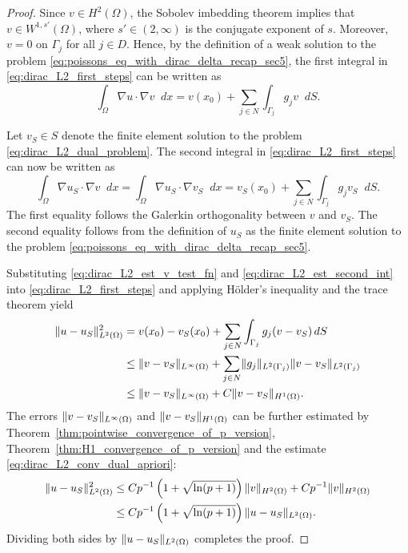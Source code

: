 \documentclass[english, 12pt, a4paper, sci, utf8, a-2b, online]{aaltothesis}
\theoremstyle{definition}
\theoremstyle{plain}
\DeclarePairedDelimiter\norm{\lVert}{\rVert}
\newcommand*\diff{\mathop{}\!d}
\numberwithin{equation}{section}
\begin{document}
\begin{proof}
    Since $v \in H^2(\Omega)$, the Sobolev imbedding theorem implies that
    $v \in W^{1,s'}(\Omega)$, where $s' \in (2, \infty)$ is the conjugate exponent of $s$.
    Moreover, $v = 0$ on $\Gamma_j$ for all $j \in D$.
    Hence, by the definition of a weak solution to the problem
    \eqref{eq:poissons_eq_with_dirac_delta_recap_sec5}, the first integral in
    \eqref{eq:dirac_L2_first_steps} can be written as
    \begin{equation}
        \label{eq:dirac_L2_est_v_test_fn}
        \int_{\Omega} \nabla u \cdot \nabla v \diff x
        = v(x_0) + \sum_{j \in N} \int_{\Gamma_j} g_j v \diff S.
    \end{equation}

    Let $v_S \in S$ denote the finite element solution to the problem
    \eqref{eq:dirac_L2_dual_problem}. The second integral in \eqref{eq:dirac_L2_first_steps}
    can now be written as
    \begin{equation}
        \label{eq:dirac_L2_est_second_int}
        \int_{\Omega} \nabla u_S \cdot \nabla v \diff x
        = \int_{\Omega} \nabla u_S \cdot \nabla v_S \diff x
        = v_S(x_0) + \sum_{j \in N} \int_{\Gamma_j} g_j v_S \diff S.
    \end{equation}
    The first equality follows the Galerkin orthogonality between $v$ and $v_S$.
    The second equality follows from the definition of $u_S$ as the finite element solution
    to the problem \eqref{eq:poissons_eq_with_dirac_delta_recap_sec5}.

    Substituting \eqref{eq:dirac_L2_est_v_test_fn} and \eqref{eq:dirac_L2_est_second_int}
    into \eqref{eq:dirac_L2_first_steps} and applying Hölder's inequality and
    the trace theorem yield
    \begin{align*}
        \norm{u - u_S}_{L^2(\Omega)}^2
        &= v(x_0) - v_S(x_0) + \sum_{j \in N} \int_{\Gamma_j} g_j (v - v_S) \diff S \\
        &\leq \norm{v - v_S}_{L^{\infty}(\Omega)}
            + \sum_{j \in N} \norm{g_j}_{L^2(\Gamma_j)} \norm{v - v_S}_{L^2(\Gamma_j)} \\
        &\leq \norm{v - v_S}_{L^{\infty}(\Omega)}
            + C \norm{v - v_S}_{H^1(\Omega)}.
    \end{align*}
    The errors $\norm{v - v_S}_{L^{\infty}(\Omega)}$ and $\norm{v - v_S}_{H^1(\Omega)}$
    can be further estimated by Theorem~\ref{thm:pointwise_convergence_of_p_version},
    Theorem~\ref{thm:H1_convergence_of_p_version} and
    the estimate \eqref{eq:dirac_L2_conv_dual_apriori}:
    \begin{align*}
        \norm{u - u_S}_{L^2(\Omega)}^2
        &\leq C p^{-1} \left( 1 + \sqrt{\ln(p+1)} \right) \norm{v}_{H^2(\Omega)}
            + C p^{-1} \norm{v}_{H^2(\Omega)} \\
        &\leq C p^{-1} \left( 1 + \sqrt{\ln(p+1)} \right) \norm{u - u_S}_{L^2(\Omega)}.
    \end{align*}
    Dividing both sides by $\norm{u - u_S}_{L^2(\Omega)}$ completes the proof.
\end{proof}
\end{document}
